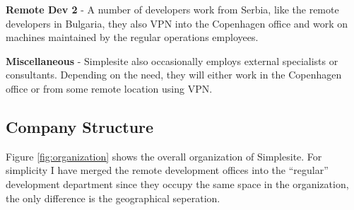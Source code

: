 \begin{itemize*}
    \item \textbf{Remote Dev 2} - A number of developers work from
          Serbia, like the remote developers in Bulgaria, they also VPN into the
          Copenhagen office and work on machines maintained by the regular
          operations employees.

    \item \textbf{Miscellaneous} - Simplesite also occasionally employs external
          specialists or consultants. Depending on the need, they will either
          work in the Copenhagen office or from some remote location using VPN.
\end{itemize*}


\subsection{Company Structure}

Figure \ref{fig:organization} shows the overall organization of Simplesite. For
simplicity I have merged the remote development offices into the ``regular''
development department since they occupy the same space in the organization, the
only difference is the geographical seperation.

\begin{landscape}
\end{landscape}